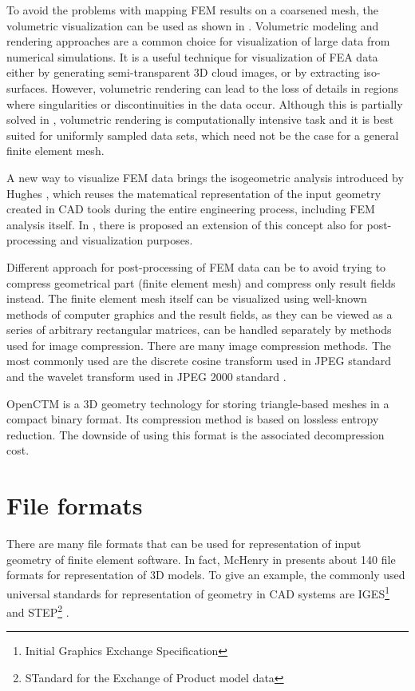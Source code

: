 To avoid the problems with mapping FEM results on a coarsened mesh, the volumetric visualization can be used as shown in \cite{Ueng2004}. Volumetric modeling and rendering approaches are a common choice for visualization of large data from numerical simulations. It is a useful technique for visualization of FEA data either by generating semi-transparent 3D cloud images, or by extracting iso-surfaces. However, volumetric rendering can lead to the loss of details in regions where singularities or discontinuities in the data occur. Although this is partially solved in \cite{Robaina2010}, volumetric rendering is computationally intensive task and it is best suited for uniformly sampled data sets, which need not be the case for a general finite element mesh.

A new way to visualize FEM data brings the isogeometric analysis introduced by Hughes \cite{Hughes2005}, which reuses the matematical representation of the input geometry created in CAD tools during the entire engineering process, including FEM analysis itself. In \cite{Stahl2017}, there is proposed an extension of this concept also for post-processing and visualization purposes.

Different approach for post-processing of FEM data can be to avoid trying to compress geometrical part (finite element mesh) and compress only result fields instead. The finite element mesh itself can be visualized using well-known methods of computer graphics and the result fields, as they can be viewed as a series of arbitrary rectangular matrices, can be handled separately by methods used for image compression. There are many image compression methods. The most commonly used are the discrete cosine transform \cite{Watson1994} used in JPEG standard and the wavelet transform used in JPEG 2000 standard \cite{Lui2001}.

OpenCTM \cite{OpenCTM2010} is a 3D geometry technology for storing triangle-based meshes in a compact binary format. Its compression method is based on lossless entropy reduction. The downside of using this format is the associated decompression cost.


\section{File formats}

There are many file formats that can be used for representation of input geometry of finite element software. In fact, McHenry in \cite{McHenry2008} presents about 140 file formats for representation of 3D models. To give an example, the commonly used universal standards for representation of geometry in CAD systems are IGES\footnote{Initial Graphics Exchange Specification} \cite{Groton2006} and STEP\footnote{STandard for the Exchange of Product model data} \cite{Pratt2001}.


